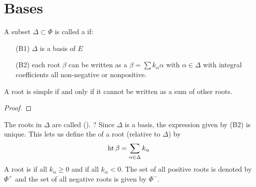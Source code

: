 \section{Bases}
\label{sec:bases}

A subset $\Delta \subset \Phi$ is called a  if:
\begin{itemize}
    \makethislistcompact
    \item [(B1)] $\Delta$ is a basis of $E$
    \item [(B2)] each root $\beta$ can be written as a $\beta = \sum k_\alpha \alpha$ with $\alpha\in \Delta$ with integral coefficients all non-negative or nonpositive.
\end{itemize}

\begin{insight}
   \begin{lemma}
       A root is simple if and only if it cannot be written as a sum of other roots.
   \end{lemma} 
   \begin{proof}
   \end{proof}
\end{insight}

The roots in $\Delta$ are called  ().
? 
Since $\Delta$ is a basis, the expression given by (B2) is unique. This lets us define the  of a root (relative to $\Delta$) by 
\begin{align}
    \operatorname{ht} \beta = \sum_{\alpha\in \Delta} k_\alpha
\end{align}
A root is  if all $k_\alpha\geq0$ and  if all $k_\alpha<0$. The set of all positive roots is denoted by $\Phi^+$ and the set of all negative roots is given by $\Phi^-$.

